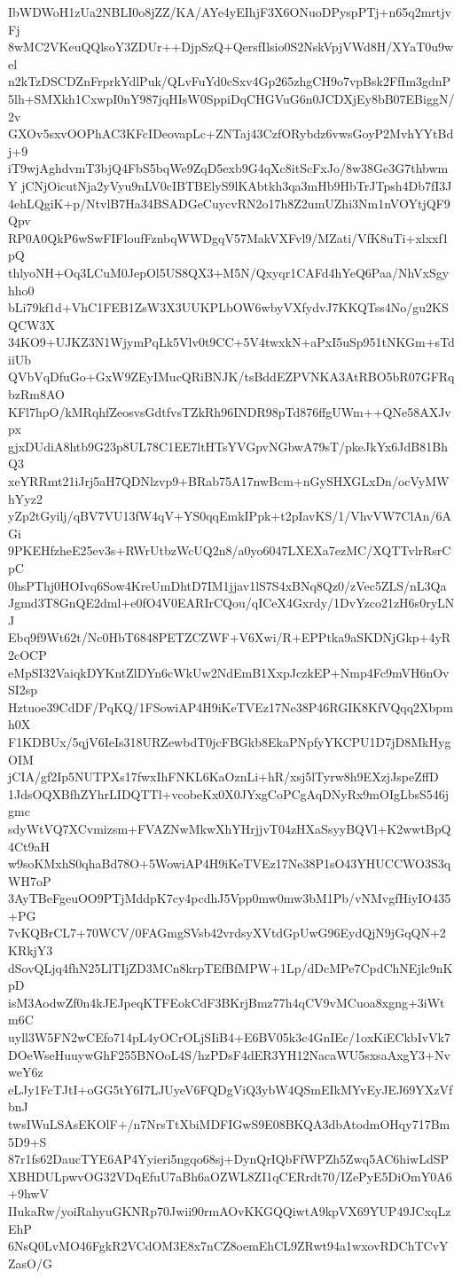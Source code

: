 IbWDWoH1zUa2NBLI0o8jZZ/KA/AYe4yEIhjF3X6ONuoDPyspPTj+n65q2mrtjvFj
8wMC2VKeuQQlsoY3ZDUr++DjpSzQ+QersfIlsio0S2NskVpjVWd8H/XYaT0u9wel
n2kTzDSCDZnFrprkYdlPuk/QLvFuYd0cSxv4Gp265zhgCH9o7vpBsk2FfIm3gdnP
5lh+SMXkh1CxwpI0nY987jqHIsW0SppiDqCHGVuG6n0JCDXjEy8bB07EBiggN/2v
GXOv5sxvOOPhAC3KFcIDeovapLc+ZNTaj43CzfORybdz6vwsGoyP2MvhYYtBdj+9
iT9wjAghdvmT3bjQ4FbS5bqWe9ZqD5exb9G4qXc8itScFxJo/8w38Ge3G7thbwmY
jCNjOicutNja2yVyu9nLV0cIBTBElyS9lKAbtkh3qa3mHb9HbTrJTpsh4Db7fI3J
4ehLQgiK+p/NtvlB7Ha34BSADGeCuycvRN2o17h8Z2umUZhi3Nm1nVOYtjQF9Qpv
RP0A0QkP6wSwFIFloufFznbqWWDgqV57MakVXFvl9/MZati/VfK8uTi+xlxxf1pQ
thlyoNH+Oq3LCuM0JepOl5US8QX3+M5N/Qxyqr1CAFd4hYeQ6Paa/NhVxSgyhho0
bLi79kf1d+VhC1FEB1ZsW3X3UUKPLbOW6wbyVXfydvJ7KKQTss4No/gu2KSQCW3X
34KO9+UJKZ3N1WjymPqLk5Vlv0t9CC+5V4twxkN+aPxI5uSp951tNKGm+sTdiiUb
QVbVqDfuGo+GxW9ZEyIMucQRiBNJK/tsBddEZPVNKA3AtRBO5bR07GFRqbzRm8AO
KFl7hpO/kMRqhfZeosvsGdtfvsTZkRh96INDR98pTd876ffgUWm++QNe58AXJvpx
gjxDUdiA8htb9G23p8UL78C1EE7ltHTsYVGpvNGbwA79sT/pkeJkYx6JdB81BhQ3
xeYRRmt21iJrj5aH7QDNlzvp9+BRab75A17nwBcm+nGySHXGLxDn/ocVyMWhYyz2
yZp2tGyilj/qBV7VU13fW4qV+YS0qqEmkIPpk+t2pIavKS/1/VhvVW7ClAn/6AGi
9PKEHfzheE25ev3s+RWrUtbzWcUQ2n8/a0yo6047LXEXa7ezMC/XQTTvlrRsrCpC
0hsPThj0HOIvq6Sow4KreUmDhtD7IM1jjav1lS7S4xBNq8Qz0/zVec5ZLS/nL3Qa
Jgmd3T8GnQE2dml+e0fO4V0EARIrCQou/qICeX4Gxrdy/1DvYzco21zH6s0ryLNJ
Ebq9f9Wt62t/Nc0HbT6848PETZCZWF+V6Xwi/R+EPPtka9aSKDNjGkp+4yR2cOCP
eMpSI32VaiqkDYKntZlDYn6cWkUw2NdEmB1XxpJczkEP+Nmp4Fc9mVH6nOvSI2sp
Hztuoe39CdDF/PqKQ/1FSowiAP4H9iKeTVEz17Ne38P46RGIK8KfVQqq2Xbpmh0X
F1KDBUx/5qjV6IeIs318URZewbdT0jcFBGkb8EkaPNpfyYKCPU1D7jD8MkHygOIM
jCIA/gf2Ip5NUTPXs17fwxIhFNKL6KaOznLi+hR/xsj5lTyrw8h9EXzjJspeZffD
1JdsOQXBfhZYhrLIDQTTl+vcobeKx0X0JYxgCoPCgAqDNyRx9mOIgLbsS546jgmc
sdyWtVQ7XCvmizsm+FVAZNwMkwXhYHrjjvT04zHXaSsyyBQVl+K2wwtBpQ4Ct9aH
w9soKMxhS0qhaBd78O+5WowiAP4H9iKeTVEz17Ne38P1sO43YHUCCWO3S3qWH7oP
3AyTBeFgeuOO9PTjMddpK7cy4pcdhJ5Vpp0mw0mw3bM1Pb/vNMvgfHiyIO435+PG
7vKQBrCL7+70WCV/0FAGmgSVsb42vrdsyXVtdGpUwG96EydQjN9jGqQN+2KRkjY3
dSovQLjq4fhN25LlTIjZD3MCn8krpTEfBfMPW+1Lp/dDcMPe7CpdChNEjlc9nKpD
isM3AodwZf0n4kJEJpeqKTFEokCdF3BKrjBmz77h4qCV9vMCuoa8xgng+3iWtm6C
uyll3W5FN2wCEfo714pL4yOCrOLjSIiB4+E6BV05k3c4GnIEc/1oxKiECkbIvVk7
DOeWseHuuywGhF255BNOoL4S/hzPDsF4dER3YH12NacaWU5sxsaAxgY3+NvweY6z
eLJy1FcTJtI+oGG5tY6I7LJUyeV6FQDgViQ3ybW4QSmEIkMYvEyJEJ69YXzVfbnJ
twsIWuLSAsEKOlF+/n7NrsTtXbiMDFIGwS9E08BKQA3dbAtodmOHqy717Bm5D9+S
87r1fs62DaucTYE6AP4Yyieri5ngqo68sj+DynQrIQbFfWPZh5Zwq5AC6hiwLdSP
XBHDULpwvOG32VDqEfuU7aBh6aOZWL8ZI1qCERrdt70/IZePyE5DiOmY0A6+9hwV
IIukaRw/yoiRahyuGKNRp70Jwii90rmAOvKKGQQiwtA9kpVX69YUP49JCxqLzEhP
6NsQ0LvMO46FgkR2VCdOM3E8x7nCZ8oemEhCL9ZRwt94a1wxovRDChTCvYZasO/G
